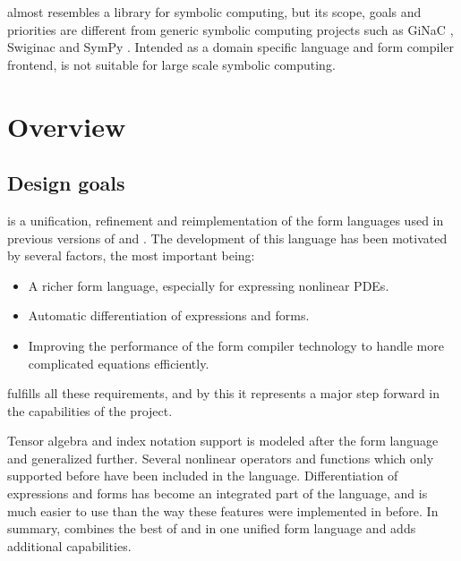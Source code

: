 \ufl{} almost resembles a library for symbolic computing, but its
scope, goals and priorities are different from generic symbolic
computing projects such as GiNaC \citep{BauerFrinkKreckel2000},
Swiginac \citep{SkavhaugCertik2009} and SymPy \citep{Certikothers2009}.
Intended as a domain specific language and form compiler frontend, \ufl{}
is not suitable for large scale symbolic computing.

\section{Overview} \label{ufl:sec:overview}

\subsection{Design goals} \label{ufl:sec:goals}

\ufl{} is a unification, refinement and reimplementation of the
form languages used in previous versions of \ffc{} and \sfc{}.
The development of this language has been motivated by several factors,
the most important being:
\begin{itemize}
  \item A richer form language, especially for expressing nonlinear PDEs.

  \item Automatic differentiation of expressions and forms.

  \item Improving the performance of the form compiler technology to
  handle more complicated equations efficiently.
\end{itemize}
\ufl{} fulfills all these requirements, and by this it represents a major
step forward in the capabilities of the \fenics{} project.

Tensor algebra and index notation support is modeled after the \ffc{}
form language and generalized further. Several nonlinear operators
and functions which only \sfc{} supported before have been included in
the language.  Differentiation of expressions and forms has become an
integrated part of the language, and is much easier to use than the way
these features were implemented in \sfc{} before.  In summary, \ufl{}
combines the best of \ffc{} and \sfc{} in one unified form language and
adds additional capabilities.

